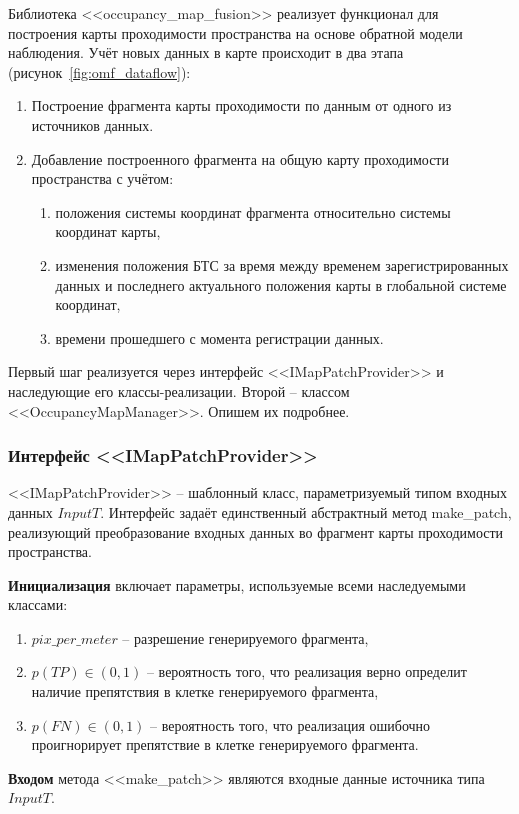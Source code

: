 Библиотека <<occupancy\_map\_fusion>> реализует функционал для построения карты проходимости пространства на основе обратной модели наблюдения. Учёт новых данных в карте происходит в два этапа (рисунок~\cref{fig:omf_dataflow}):

\begin{enumerate}
	\item Построение фрагмента карты проходимости по данным от одного из источников данных.
	\item Добавление построенного фрагмента на общую карту проходимости пространства с учётом:
	\begin{enumerate}
	\item положения системы координат фрагмента относительно системы координат карты,
	\item изменения положения БТС за время между временем зарегистрированных данных и последнего актуального положения карты в глобальной системе координат,
	\item времени прошедшего с момента регистрации данных.
	\end{enumerate}
\end{enumerate}

Первый шаг реализуется через интерфейс <<IMapPatchProvider>> и наследующие его классы-реализации. Второй -- классом <<OccupancyMapManager>>. Опишем их подробнее.

\subsubsection{Интерфейс <<IMapPatchProvider>>}
<<IMapPatchProvider>> -- шаблонный класс, параметризуемый типом входных данных $InputT$. Интерфейс задаёт единственный абстрактный метод make\_patch, реализующий преобразование входных данных во фрагмент карты проходимости пространства.

\textbf{Инициализация} включает параметры, используемые всеми наследуемыми классами:
\begin{enumerate}
	\item $pix\_per\_meter$ -- разрешение генерируемого фрагмента,
	\item $p(TP) \in (0,1)$ -- вероятность того, что реализация верно определит наличие препятствия в клетке генерируемого фрагмента,
	\item $p(FN) \in (0,1)$ -- вероятность того, что реализация ошибочно проигнорирует препятствие в клетке генерируемого фрагмента.
\end{enumerate}

\textbf{Входом} метода <<make\_patch>> являются входные данные источника типа $InputT$.

